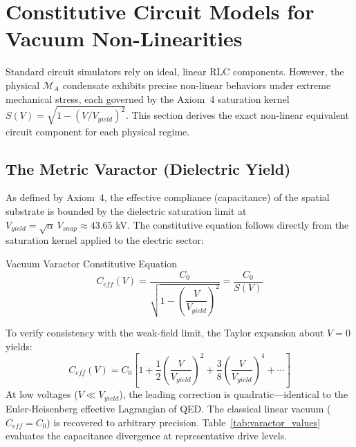 \section{Constitutive Circuit Models for Vacuum Non-Linearities}
\label{sec:vca_nonlinear}

Standard circuit simulators rely on ideal, linear RLC components. However, the physical $\mathcal{M}_A$ condensate exhibits precise non-linear behaviors under extreme mechanical stress, each governed by the Axiom~4 saturation kernel $S(V) = \sqrt{1-(V/V_{yield})^2}$. This section derives the exact non-linear equivalent circuit component for each physical regime.

\subsection{The Metric Varactor (Dielectric Yield)}

As defined by Axiom~4, the effective compliance (capacitance) of the spatial substrate is bounded by the dielectric saturation limit at $V_{yield} = \sqrt{\alpha}\, V_{snap} \approx 43.65$ kV. The constitutive equation follows directly from the saturation kernel applied to the electric sector:
\begin{resultbox}{Vacuum Varactor Constitutive Equation}
\begin{equation}
    C_{eff}(V) = \frac{C_0}{\sqrt{1 - \left(\dfrac{V}{V_{yield}}\right)^{\!2}}} = \frac{C_0}{S(V)}
    \label{eq:varactor}
\end{equation}
\end{resultbox}

To verify consistency with the weak-field limit, the Taylor expansion about $V = 0$ yields:
\begin{equation}
    C_{eff}(V) = C_0 \left[1 + \frac{1}{2}\left(\frac{V}{V_{yield}}\right)^{\!2} + \frac{3}{8}\left(\frac{V}{V_{yield}}\right)^{\!4} + \cdots\right]
    \label{eq:varactor_taylor}
\end{equation}
At low voltages ($V \ll V_{yield}$), the leading correction is quadratic---identical to the Euler-Heisenberg effective Lagrangian of QED. The classical linear vacuum ($C_{eff} = C_0$) is recovered to arbitrary precision. Table~\ref{tab:varactor_values} evaluates the capacitance divergence at representative drive levels.

